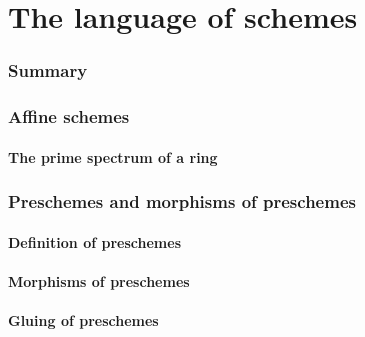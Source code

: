 \documentclass[10pt,oneside]{amsart}
\begin{document}
\clearpage


\setcounter{subsection}{0}
\part{The language of schemes}
    
    \section*{Summary}
    

    \section{Affine schemes}
       
       \subsection{The prime spectrum of a ring}

    \section{Preschemes and morphisms of preschemes}

        \subsection{Definition of preschemes}
        

        \subsection{Morphisms of preschemes}
        

        \subsection{Gluing of preschemes}
        
\end{document}
